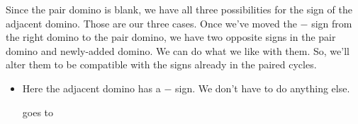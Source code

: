 \documentclass[12pt]{article}
\numberwithin{equation}{section}
\newcommand{\horizontalDominoMaybe}[3]{\filldraw [dominoMaybeStyle] (#2 - 1 + \eps, #1 - 1 + \eps) rectangle + (2 - \teps, 1 -\teps) node [dominoText] {$#3$};}
\newcommand{\verticalDominoMaybeShift}[4]{\filldraw [dominoMaybeStyle] (#2 - 1 + #4 + \eps,  #1 - 1 + \eps) rectangle + (1 - \teps,2 -\teps) node [dominoText] {$#3$};}
\begin{document}
\begin{itemize}
    Since the pair domino is blank, we have all three possibilities for the sign of the adjacent domino.
    Those are our three cases.
    Once we've moved the $-$ sign from the right domino to the pair domino, we have two opposite signs in the pair domino and newly-added domino.
    We can do what we like with them.
    So, we'll alter them to be compatible with the signs already in the paired cycles.
    \begin{itemize}
      \item Here the adjacent domino has a $-$ sign.
      We don't have to do anything else.
      \begin{figure}[H]
        \centering
      \end{figure}
      goes to
      \begin{figure}[H]
        \centering
\end{figure}
\end{itemize}
\end{itemize}
\end{document}
